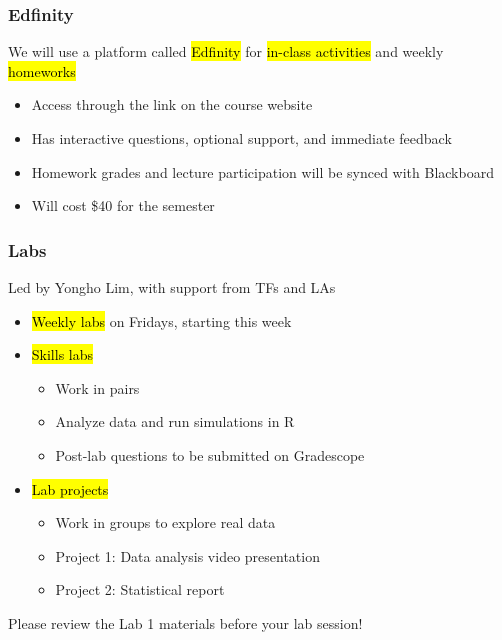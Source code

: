 \documentclass[slidestop,compress,mathserif]{beamer}
\begin{document}

\begin{frame}
	\frametitle{Edfinity} 
	We will use a platform called \hl{Edfinity} for \hl{in-class activities} and weekly \hl{homeworks}
	\begin{itemize}
		\item Access through the link on the course website
		\item Has interactive questions, optional support, and immediate feedback
		\item Homework grades and lecture participation will be synced with Blackboard
		\item Will cost \$40 for the semester
	\end{itemize}
\end{frame}


\begin{frame}
	\frametitle{Labs} 
	Led by Yongho Lim, with support from TFs and LAs
	\begin{itemize}
		\item \hl{Weekly labs} on Fridays, starting this week
		\item \hl{Skills labs}
		\begin{itemize}
			\item Work in pairs
			\item Analyze data and run simulations in R
			\item Post-lab questions to be submitted on Gradescope
		\end{itemize}
		\item \hl{Lab projects}
		\begin{itemize}
			\item Work in groups to explore real data
			\item Project 1: Data analysis video presentation
			\item Project 2: Statistical report
		\end{itemize}
	\end{itemize}
	Please review the Lab 1 materials before your lab session!
\end{frame}

\end{document}

